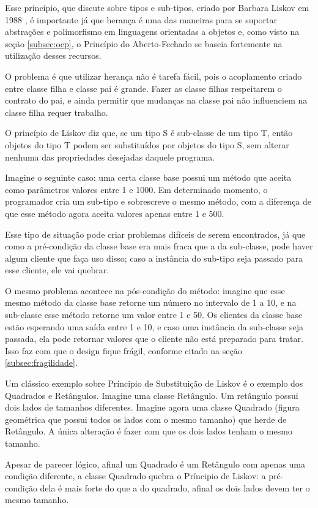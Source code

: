 Esse princípio, que discute sobre tipos e sub-tipos, criado por Barbara Liskov
em 1988 \cite{liskov}, é importante já que herança é uma das maneiras para se 
suportar abstrações e polimorfismo em linguagens orientadas a objetos e, como 
visto na seção \ref{subsec:ocp}, o Princípio do Aberto-Fechado se baseia 
fortemente na utilização desses recursos.

O problema é que utilizar herança não é tarefa fácil, pois o acoplamento criado
entre classe filha e classe pai é grande. Fazer as classe filhas respeitarem o
contrato do pai, e ainda permitir que mudanças na classe pai não influenciem na
classe filha requer trabalho.

O princípio de Liskov diz que, se um tipo S é sub-classe de um tipo T,
então objetos do tipo T podem ser substituídos por objetos do tipo S, sem
alterar nenhuma das propriedades desejadas daquele programa.

Imagine o seguinte caso: uma certa classe base possui um método que aceita como
parâmetros valores entre 1 e 1000. Em determinado momento, o programador cria um
sub-tipo e sobrescreve o mesmo método, com a diferença de que esse método agora 
aceita valores apenas entre 1 e 500. 

Esse tipo de situação pode criar problemas difíceis de serem encontrados, já que
como a pré-condição da classe base era mais fraca que a da sub-classe, pode
haver algum cliente que faça uso disso; caso a instância do sub-tipo seja
passado para esse cliente, ele vai quebrar. 

O mesmo problema acontece na pós-condição do método: imagine que esse mesmo
método da classe base retorne um número no intervalo de 1 a 10, e na sub-classe 
esse método retorne um valor entre 1 e 50. Os clientes da classe base estão 
esperando uma saída entre 1 e 10, e caso uma instância da sub-classe seja
passada, ela pode retornar valores que o cliente não está preparado para 
tratar. Isso faz com que o design fique frágil, conforme citado na  seção
\ref{subsec:fragilidade}.

Um clássico exemplo sobre Príncipio de Substituição de Liskov é o exemplo  dos
Quadrados e Retângulos. Imagine uma classe Retângulo. Um retângulo possui dois 
lados de tamanhos diferentes. Imagine agora uma classe Quadrado (figura
geométrica que possui todos os lados com o mesmo tamanho) que herde de
Retângulo. A única alteração é fazer com que os dois lados tenham o mesmo 
tamanho. 

Apesar de parecer lógico, afinal um Quadrado é um Retângulo com apenas uma
condição diferente, a classe Quadrado quebra o Príncipio de Liskov: a
pré-condição dela é mais forte do que a do quadrado, afinal os dois lados devem 
ter o mesmo tamanho.


